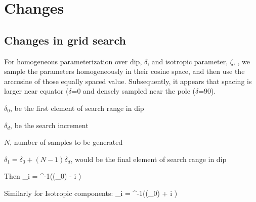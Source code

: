 \documentclass[11pt,titlepage,fleqn]{article}
\newcommand{\bdes}{\begin{description}}
\newcommand{\edes}{\end{description}}
\begin{document}
\section{Changes}
\subsection{Changes in grid search}
For homogeneous parameterization over dip, $\delta$, and isotropic parameter, $\zeta$, \citep{TapeTape2012beach}, we sample the parameters homogeneously in their cosine space, and then use the arccosine of those equally spaced value. Subsequently, it appears that spacing is larger near equator ($\delta$=0 and densely sampled near the pole ($\delta$=90).

\bdes
\item $\delta_0$, be the first element of search range in dip
\item $\delta_d$, be the search increment
\item $N$, number of samples to be generated
\item $\delta_1 = \delta_0 + (N-1)\delta_d$, would be the final element of search range in dip
\edes

Then
\eq
\delta_i = \cos^{-1}\left ({\cos(\delta_0)} - i  \right)
\en

Similarly for Isotropic components:
\eq
\zeta_i = \sin^{-1}\left ({\sin(\zeta_0)} + i  \right)
\en
\end{document}
